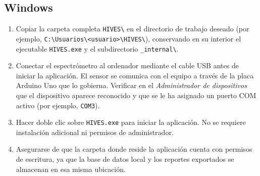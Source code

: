 \subsection*{Windows}
\begin{enumerate}
  \item Copiar la carpeta completa \texttt{HIVES\textbackslash} en el directorio de
        trabajo deseado (por ejemplo,
        \texttt{C:\textbackslash Usuarios\textbackslash <usuario>\textbackslash HIVES\textbackslash}),
        conservando en su interior el ejecutable \texttt{HIVES.exe} y el
        subdirectorio \texttt{\_internal\textbackslash}.
  \item Conectar el espectrómetro al ordenador mediante el cable USB antes de
        iniciar la aplicación. El sensor se comunica con el equipo a través de la
        placa Arduino Uno que lo gobierna. Verificar en el \emph{Administrador de
        dispositivos} que el dispositivo aparece reconocido y que se le ha asignado
        un puerto COM activo (por ejemplo, \texttt{COM3}).
  \item Hacer doble clic sobre \texttt{HIVES.exe} para iniciar la aplicación. No se
        requiere instalación adicional ni permisos de administrador.
  \item Asegurarse de que la carpeta donde reside la aplicación cuenta con permisos
        de escritura, ya que la base de datos local y los reportes exportados se
        almacenan en esa misma ubicación.
\end{enumerate}

